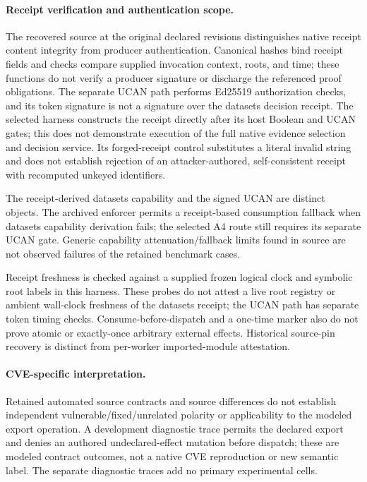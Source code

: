 \paragraph{Receipt verification and authentication scope.}
The recovered source at the original declared revisions distinguishes native
receipt content integrity from producer authentication. Canonical hashes bind
receipt fields and checks compare supplied invocation context, roots, and time;
these functions do not verify a producer signature or discharge the referenced
proof obligations. The separate UCAN path performs Ed25519 authorization checks,
and its token signature is not a signature over the datasets decision receipt.
The selected harness constructs the receipt directly after its host Boolean
and UCAN gates; this does not demonstrate execution of the full native evidence
selection and decision service. Its forged-receipt control substitutes a literal
invalid string and does not establish rejection of an attacker-authored,
self-consistent receipt with recomputed unkeyed identifiers.

The receipt-derived datasets capability and the signed UCAN are distinct
objects. The archived enforcer permits a receipt-based consumption fallback
when datasets capability derivation fails; the selected A4 route still requires
its separate UCAN gate. Generic capability attenuation/fallback limits found
in source are not observed failures of the retained benchmark cases.

Receipt freshness is checked against a supplied frozen logical clock and
symbolic root labels in this harness. These probes do not attest a live root
registry or ambient wall-clock freshness of the datasets receipt; the UCAN path
has separate token timing checks. Consume-before-dispatch and a one-time marker
also do not prove atomic or exactly-once arbitrary external effects. Historical
source-pin recovery is distinct from per-worker imported-module attestation.

\paragraph{CVE-specific interpretation.}
Retained automated source contracts and source differences do not establish
independent vulnerable/fixed/unrelated polarity or applicability to the modeled
export operation. A development diagnostic trace permits the declared export
and denies an authored undeclared-effect mutation before dispatch; these are
modeled contract outcomes, not a native CVE reproduction or new semantic label.
The separate diagnostic traces add no primary experimental cells.
